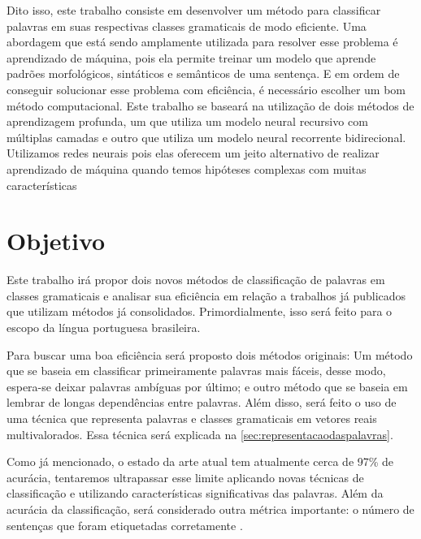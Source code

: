 Dito isso, este trabalho consiste em desenvolver um método para classificar palavras em suas respectivas classes gramaticais de modo eficiente. Uma abordagem que está sendo amplamente utilizada para resolver esse problema é aprendizado de máquina, pois ela permite treinar um modelo que aprende padrões morfológicos, sintáticos e semânticos de uma sentença. E em ordem de conseguir solucionar esse problema com eficiência, é necessário escolher um bom método computacional. Este trabalho se baseará na utilização de dois métodos de aprendizagem profunda, um que utiliza um modelo neural recursivo com múltiplas camadas e outro que utiliza um modelo neural recorrente bidirecional. Utilizamos redes neurais pois elas oferecem um jeito alternativo de realizar aprendizado de máquina quando temos hipóteses complexas com muitas características 


\section{Objetivo}\label{sec:objetivo}

Este trabalho irá propor dois novos métodos de classificação de palavras em classes gramaticais e analisar sua eficiência em relação a trabalhos já publicados que utilizam métodos já consolidados. Primordialmente, isso será feito para o escopo da língua portuguesa brasileira. 

Para buscar uma boa eficiência será proposto dois métodos originais: Um método que se baseia em classificar primeiramente palavras mais fáceis, desse modo, espera-se deixar palavras ambíguas por último; e outro método que se baseia em lembrar de longas dependências entre palavras. Além disso, será feito o uso de uma técnica que  representa palavras e classes gramaticais em vetores reais multivalorados. Essa técnica será explicada na \autoref{sec:representacaodaspalavras}. 

Como já mencionado, o estado da arte atual tem atualmente cerca de 97\% de acurácia, tentaremos ultrapassar esse limite aplicando novas técnicas de classificação e utilizando características significativas das palavras. Além da acurácia da classificação, será considerado outra métrica importante: o número de sentenças que foram etiquetadas corretamente \cite{manning2011part}.


